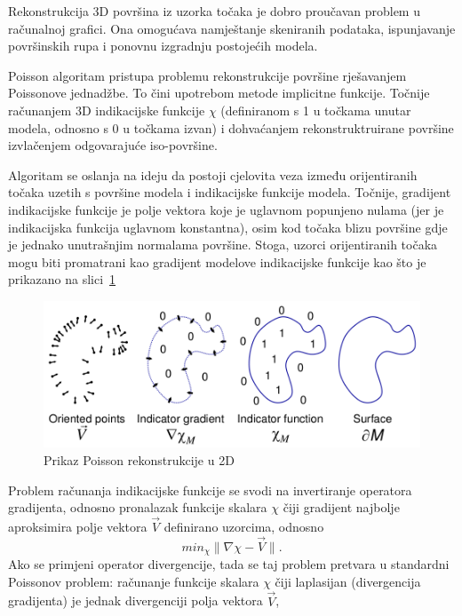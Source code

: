
Rekonstrukcija 3D površina iz uzorka točaka je dobro proučavan problem u
računalnoj grafici. Ona omogućava namještanje skeniranih
podataka, ispunjavanje površinskih rupa i ponovnu izgradnju postojećih
modela.

Poisson algoritam pristupa problemu rekonstrukcije površine rješavanjem
Poissonove jednadžbe. To čini upotrebom metode implicitne funkcije.
Točnije računanjem 3D indikacijske funkcije \(\chi\) (definiranom s 1 u
točkama unutar modela, odnosno s 0 u točkama izvan) i dohvaćanjem
rekonstruktruirane površine izvlačenjem odgovarajuće iso-površine.

Algoritam se oslanja na ideju da postoji cjelovita veza između
orijentiranih točaka uzetih s površine modela i indikacijske funkcije
modela. Točnije, gradijent indikacijske funkcije je polje vektora koje
je uglavnom popunjeno nulama (jer je indikacijska funkcija uglavnom
konstantna), osim kod točaka blizu površine gdje je jednako unutrašnjim
normalama površine. Stoga, uzorci orijentiranih točaka mogu biti
promatrani kao gradijent modelove indikacijske funkcije kao što je
prikazano na slici~\ref{fig:poisson-reconstruction.png}

\begin{figure}[h]
\centering
\includegraphics[scale=0.35]{figures/poisson-reconstruction.png}
\caption{Prikaz Poisson rekonstrukcije u 2D}
\label{fig:poisson-reconstruction.png}
\end{figure}

Problem računanja indikacijske funkcije se svodi na invertiranje
operatora gradijenta, odnosno pronalazak funkcije skalara \(\chi\) čiji
gradijent najbolje aproksimira polje vektora \(\vec{V}\) definirano
uzorcima, odnosno 
\begin{equation*}
min_\chi \|\nabla\chi - \vec{V}\|.
\end{equation*}
Ako se primjeni operator divergencije, tada se taj problem pretvara u
standardni Poissonov problem: računanje funkcije skalara \(\chi\) čiji
laplasijan (divergencija gradijenta) je jednak divergenciji polja
vektora \(\vec{V}\),

